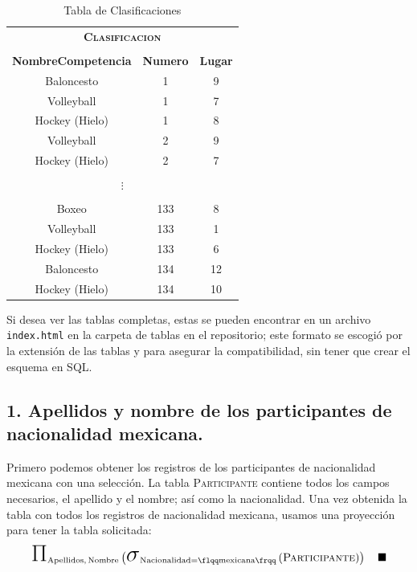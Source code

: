 \documentclass[a4paper, twoside, 12pt]{article}
\newcommand{\str}[1]{\mathrm{\flqq #1 \frqq}}
\newcommand{\tblstr}[1]{\mathrm{\textsc{#1}}}
\newcommand{\select}[4]{\makebox{\huge\ensuremath{\sigma}}_{\mathrm{#1} #2 #3}\left( #4 \right)}
\newcommand{\project}[2]{\makebox{\huge\ensuremath{\Pi}}_{\mathrm{#1}} \left( #2 \right)}
\begin{document}
\begin{table}[H]
    \centering
    \begin{tabular}{|ccc|}
        \multicolumn{3}{c}{\bfseries{\scshape{Clasificacion}}}\\
        \multicolumn{3}{c}{}\\\hline
        \textbf{NombreCompetencia} &  \textbf{Numero} & \textbf{Lugar} \\\hline
         Baloncesto &	      1   & 9\\
         Volleyball &	      1   & 7\\
         Hockey (Hielo) &   1   & 8\\
         Volleyball &	      2   & 9\\
         Hockey (Hielo) &	   2   & 7\\
         \multicolumn{3}{|c|}{}\\
         \multicolumn{3}{|c|}{$\vdots$}\\
         \multicolumn{3}{|c|}{}\\
         Boxeo          &	133   &	8\\
         Volleyball     &	133   &	1\\
         Hockey (Hielo) &	133   &   6\\
         Baloncesto     &	134   &	12\\
         Hockey (Hielo) &	134   &   10\\\hline
    \end{tabular}
    \caption{Tabla de Clasificaciones}
    \label{tab:Clas}
\end{table}

Si desea ver las tablas completas, estas se pueden encontrar en un archivo {\tt{index.html}} en la carpeta de tablas en el repositorio; este formato se escogió por la extensión de las tablas y para asegurar la compatibilidad, sin tener que crear el esquema en SQL.

\subsection*{1. Apellidos y nombre de los participantes de nacionalidad mexicana.}

Primero podemos obtener los registros de los participantes de nacionalidad mexicana con una selección. La tabla \textsc{Participante} contiene todos los campos necesarios, el apellido y el nombre; así como la nacionalidad. Una vez obtenida la tabla con todos los registros de nacionalidad mexicana, usamos una proyección para tener la tabla solicitada:
\begin{equation*}
    \project
        {\mathrm{Apellidos,\, Nombre}}
        {\select
            {Nacionalidad}
            {=}
            {\str{mexicana}}
            {\tblstr{Participante}}} \quad \blacksquare
\end{equation*}
\end{document}
